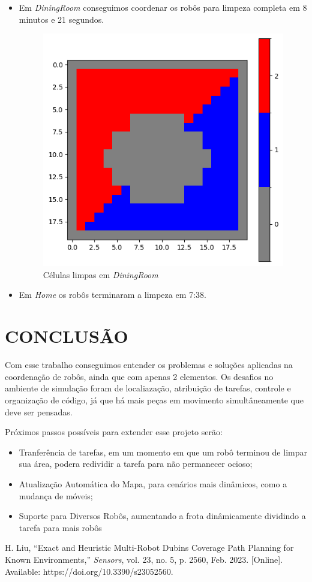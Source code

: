 \documentclass[a4paper, 10pt, conference]{ieeeconf}      %
\begin{document}
\begin{itemize}
    \item Em \textit{DiningRoom} conseguimos coordenar os robôs para limpeza completa em 8 minutos e
          21 segundos.
          \begin{figure}[htb!]
              \centering
              \includegraphics[scale=0.4]{../clean.png}
              \caption{Células limpas em \textit{DiningRoom}}
          \end{figure}
    \item Em \textit{Home} os robôs terminaram a limpeza em 7:38.
\end{itemize}


\newpage

\section{CONCLUSÃO}

Com esse trabalho conseguimos entender os problemas e soluções aplicadas na coordenação
de robôs, ainda que com apenas 2 elementos. Os desafios no ambiente de simulação foram de
localiazação, atribuição de tarefas, controle e organização de código, já que há mais peças
em movimento simultâneamente que deve ser pensadas.

Próximos passos possíveis para extender esse projeto serão:
\begin{itemize}
    \item Tranferência de tarefas, em um momento em que um robô terminou de limpar sua área, podera redividir a tarefa para não permanecer ocioso;
    \item Atualização Automática do Mapa, para cenários mais dinâmicos, como a mudança de móveis;
    \item Suporte para Diversos Robôs, aumentando a frota dinâmicamente dividindo a tarefa para mais robôs
\end{itemize}

\begin{thebibliography}{99}
    
     H. Liu, ``Exact and Heuristic Multi-Robot Dubins Coverage Path Planning for Known Environments,'' \textit{Sensors}, vol. 23, no. 5, p. 2560, Feb. 2023. [Online]. Available: https://doi.org/10.3390/s23052560.
    
    
\end{thebibliography}
\end{document}
